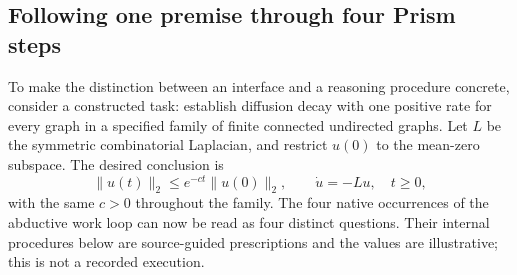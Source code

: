 %
%
%
\subsection{Following one premise through four Prism steps}
\label{sec:step-walkthrough}
To make the distinction between an interface and a reasoning procedure concrete,
consider a constructed task: establish diffusion decay with one positive rate for
every graph in a specified family of finite connected undirected graphs. Let $L$
be the symmetric combinatorial Laplacian, and restrict $u(0)$ to the mean-zero
subspace. The desired conclusion is
\[
 \|u(t)\|_2\leq e^{-ct}\|u(0)\|_2,
 \qquad \dot u=-Lu,\quad t\geq0,
\]
with the same $c>0$ throughout the family. The four native occurrences of the
abductive work loop can now be read as four distinct questions. Their internal
procedures below are source-guided prescriptions and the values are illustrative;
this is not a recorded execution.

